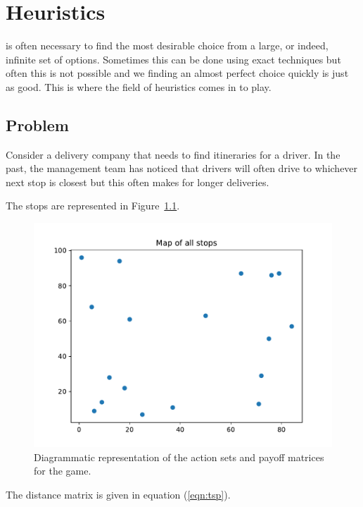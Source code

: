 \chapter[Heuristics]{Heuristics}

 is often necessary to find the most desirable choice from
a large, or indeed, infinite set of options. Sometimes this can be done using
exact techniques but often this is not possible and we finding an almost perfect
choice quickly is just as good. This is where the field of heuristics comes in
to play.

\section{Problem}\label{sec:problem}

Consider a delivery company that needs to find itineraries for a driver. In
the past, the management team has noticed that drivers will often drive to
whichever next stop is closest but this often makes for longer deliveries.

The stops are represented in Figure~\ref{fig:tsp}.

\begin{figure}
    \begin{center}
        \includegraphics[width=.8\textwidth]{./assets/tsp/main.pdf}
    \end{center}
    \caption{Diagrammatic representation of the action sets and payoff matrices for
    the game.}
    \label{fig:tsp}
\end{figure}

The distance matrix is given in equation (\ref{eqn:tsp}).

\tiny{
    
}
\normalsize


